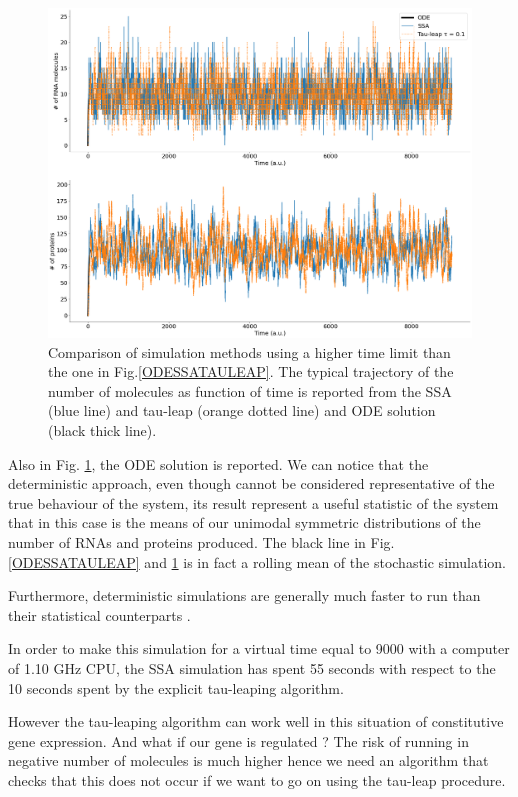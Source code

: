 \documentclass[12pt,a4paper]{report}
\begin{document}
\begin{figure}[!ht]
\centering
\includegraphics[scale=0.30]{ODESSATauleaptimeplot9000au.png}
\caption{Comparison of simulation methods using a higher time limit than the one in Fig.\ref{ODESSATAULEAP}. The typical trajectory of the number of molecules as function of time is reported from the SSA (blue line) and tau-leap (orange dotted line) and ODE solution (black thick line).}
\label{ODESSATauleaptimeplot9000}
\end{figure}
\newpage
Also in Fig. \ref{ODESSATauleaptimeplot9000}, the ODE solution is reported. We can notice that the deterministic approach, even though cannot be considered representative of the true behaviour of the system, its result represent a useful statistic of the system that in this case is the means of our unimodal symmetric distributions of the number of RNAs and proteins produced. The black line in Fig. \ref{ODESSATAULEAP} and \ref{ODESSATauleaptimeplot9000} is in fact a rolling mean of the stochastic simulation.

Furthermore, deterministic simulations are generally much faster to run than their statistical counterparts \cite{Article}.

In order to make this simulation for a virtual time equal to 9000 with a computer of 1.10 GHz CPU, the SSA simulation has spent 55 seconds with respect to the 10 seconds spent by the explicit tau-leaping algorithm. 

However the tau-leaping algorithm can work well in this situation of constitutive gene expression. And what if our gene is regulated ? The risk of running in negative number of molecules is much higher hence we need an algorithm that checks that this does not occur if we want to go on using the tau-leap procedure.
\end{document}
